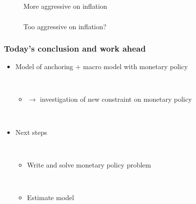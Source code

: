 \documentclass{beamer}
\def \myFigPath {../../figures/}
\def\myTinierFigScale{0.12}
\begin{document}
\begin{frame}
	\frametitle{}
\begin{figure}[h!]
\caption{More aggressive on inflation}
\end{figure}

\end{frame}

\begin{frame}
	\frametitle{}
\begin{figure}[h!]
\caption{Too aggressive on inflation?}
\end{figure}

\end{frame}


\begin{frame}
	\frametitle{Today's conclusion and work ahead}
\vspace{-1cm}
	
\begin{itemize}
\item Model of anchoring $+$ macro model with monetary policy

\

\begin{itemize}
\item[] $\rightarrow$ investigation of new constraint on monetary policy
\end{itemize}

\

\item Next steps

\

\begin{itemize}
\item Write and solve monetary policy problem

\

\item Estimate model
\end{itemize}

\end{itemize}


\end{frame}
\end{document}
